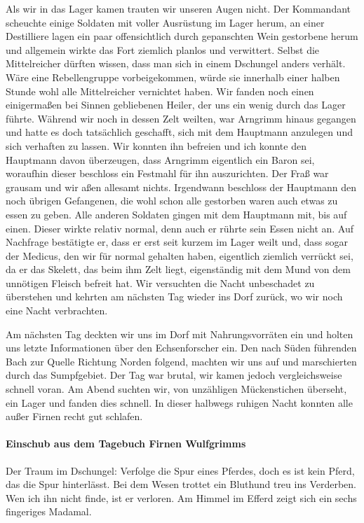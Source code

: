 Als wir in das Lager kamen trauten wir unseren Augen nicht. Der Kommandant scheuchte einige Soldaten mit voller Ausrüstung im Lager herum, an einer Destilliere lagen ein paar offensichtlich durch gepanschten Wein gestorbene herum und allgemein wirkte das Fort ziemlich planlos und verwittert. Selbst die Mittelreicher dürften wissen, dass man sich in einem Dschungel anders verhält. Wäre eine Rebellengruppe vorbeigekommen, würde sie innerhalb einer halben Stunde wohl alle Mittelreicher vernichtet haben. Wir fanden noch einen einigermaßen bei Sinnen gebliebenen Heiler, der uns ein wenig durch das Lager führte. Während wir noch in dessen Zelt weilten, war Arngrimm hinaus gegangen und hatte es doch tatsächlich geschafft, sich mit dem Hauptmann anzulegen und sich verhaften zu lassen. Wir konnten ihn befreien und ich konnte den Hauptmann davon überzeugen, dass Arngrimm eigentlich ein Baron sei, woraufhin dieser beschloss ein Festmahl für ihn auszurichten. Der Fraß war grausam und wir aßen allesamt nichts. Irgendwann beschloss der Hauptmann den noch übrigen Gefangenen, die wohl schon alle gestorben waren auch etwas zu essen zu geben. Alle anderen Soldaten gingen mit dem Hauptmann mit, bis auf einen. Dieser wirkte relativ normal, denn auch er rührte sein Essen nicht an. Auf Nachfrage bestätigte er, dass er erst seit kurzem im Lager weilt und, dass sogar der Medicus, den wir für normal gehalten haben, eigentlich ziemlich verrückt sei, da er das Skelett, das beim ihm Zelt liegt, eigenständig mit dem Mund von dem unnötigen Fleisch befreit hat. Wir versuchten die Nacht unbeschadet zu überstehen und kehrten am nächsten Tag wieder ins Dorf zurück, wo wir noch eine Nacht verbrachten. 

Am nächsten Tag deckten wir uns im Dorf mit Nahrungsvorräten ein und holten uns letzte Informationen über den Echsenforscher ein. Den nach Süden führenden Bach zur Quelle Richtung Norden folgend, machten wir uns auf und marschierten durch das Sumpfgebiet. Der Tag war brutal, wir kamen jedoch vergleichsweise schnell voran. Am Abend suchten wir, von unzähligen Mückenstichen überseht, ein Lager und fanden dies schnell. In dieser halbwegs ruhigen Nacht konnten alle außer Firnen recht gut schlafen.

\paragraph{Einschub aus dem Tagebuch Firnen Wulfgrimms} Der Traum im Dschungel:
Verfolge die Spur eines Pferdes, doch es ist kein Pferd, das die Spur
hinterlässt. Bei dem Wesen trottet ein Bluthund treu ins Verderben. Wen
ich ihn nicht finde, ist er verloren. Am Himmel im Efferd zeigt sich ein
sechs fingeriges Madamal.

